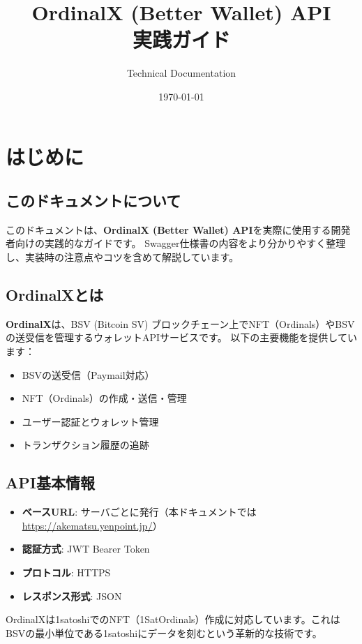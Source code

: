 \documentclass[11pt,a4paper]{ltjsarticle}  %
\title{OrdinalX (Better Wallet) API\\実践ガイド}
\author{Technical Documentation}
\date{\today}
\begin{document}
\maketitle
\tableofcontents
\newpage

\section{はじめに}

\subsection{このドキュメントについて}
このドキュメントは、\textbf{OrdinalX (Better Wallet) API}を実際に使用する開発者向けの実践的なガイドです。
Swagger仕様書の内容をより分かりやすく整理し、実装時の注意点やコツを含めて解説しています。

\subsection{OrdinalXとは}
\textbf{OrdinalX}は、BSV (Bitcoin SV) ブロックチェーン上でNFT（Ordinals）やBSVの送受信を管理するウォレットAPIサービスです。
以下の主要機能を提供しています：

\begin{itemize}
    \item BSVの送受信（Paymail対応）
    \item NFT（Ordinals）の作成・送信・管理
    \item ユーザー認証とウォレット管理
    \item トランザクション履歴の追跡
\end{itemize}

\subsection{API基本情報}
\begin{itemize}
    \item \textbf{ベースURL}: サーバごとに発行（本ドキュメントでは\url{https://akematsu.yenpoint.jp/}）
    \item \textbf{認証方式}: JWT Bearer Token
    \item \textbf{プロトコル}: HTTPS
    \item \textbf{レスポンス形式}: JSON
\end{itemize}

\begin{tcolorbox}[colback=yellow!10,colframe=orange!50!black,title=重要な注意事項]
OrdinalXは1satoshiでのNFT（1SatOrdinals）作成に対応しています。これはBSVの最小単位である1satoshiにデータを刻むという革新的な技術です。
\end{tcolorbox}
\end{document}
